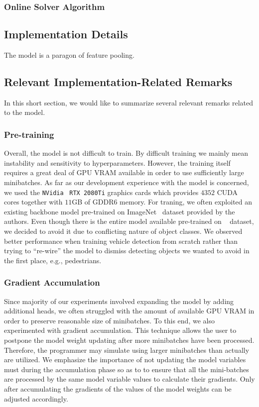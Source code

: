 \subsubsection{Online Solver Algorithm}

\subsection{Implementation Details}

The \siammot{} model is a paragon of feature pooling.

\subsection{Relevant Implementation-Related Remarks}

In this short section, we would like to summarize several relevant remarks related to the \siammot{} model.

\subsubsection{Pre-training}

Overall, the model is not difficult to train. By difficult training we mainly mean instability and sensitivity to hyperparameters. However, the training itself requires a great deal of GPU VRAM available in order to use sufficiently large minibatches. As far as our development experience with the \siammot{} model is concerned, we used the \texttt{NVidia}~\cite{webnvidia} \texttt{RTX 2080Ti} graphics cards which provides $4352$ CUDA cores together with $11$GB of GDDR6 memory. For traning, we often exploited an existing backbone model pre-trained on ImageNet~\cite{deng2009imagenet} dataset provided by the authors. Even though there is the entire model available pre-trained on \mscoco{}~\cite{lin2014mscoco} dataset, we decided to avoid it due to conflicting nature of object classes. We observed better performance when training vehicle detection from scratch rather than trying to ``re-wire'' the model to dismiss detecting objects we wanted to avoid in the first place, e.g., pedestrians.

\subsubsection{Gradient Accumulation}

Since majority of our experiments involved expanding the model by adding additional heads, we often struggled with the amount of available GPU VRAM in order to preserve reasonable size of minibatches. To this end, we also experimented with gradient accumulation. This technique allows the user to postpone the model weight updating after more minibatches have been processed. Therefore, the programmer may simulate using larger minibatches than actually are utilized. We emphasize the importance of not updating the model variables must during the accumulation phase so as to to ensure that all the mini-batches are processed by the same model variable values to calculate their gradients. Only after accumulating the gradients of the values of the model weights can be adjusted accordingly.

